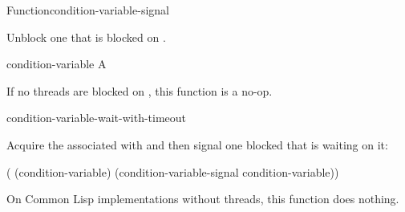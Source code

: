 \documentclass[10pt,twoside,english,pdftex]{article}
\begin{document}
\begin{functiondoc}{Function}{condition-variable-signal}%
  {}
%

\fnsyntax

\fnpurpose Unblock one  that is blocked on .

\fnpackage {}

\fnmodule {}

\fnargs
\begin{args}{condition-variable}
 A 
\end{args}

\fnerrors
\nocvlock{}

\fndescription If no threads are blocked on ,
this function is a no-op.

\begin{alsos}{condition-variable-wait-with-timeout}
\end{alsos}

%
\fnexample Acquire the  associated with
 and then signal one blocked 
that is waiting on it:
%
\W\supp
\begin{example}
  ( (condition-variable)
    (condition-variable-signal condition-variable))
\end{example}

\fnnote On Common Lisp implementations without threads, this function does
nothing.

\end{functiondoc}

\end{document}
